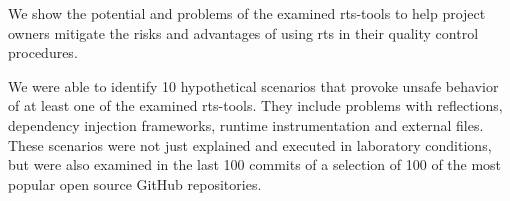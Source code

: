We show the potential and problems of the examined \ac{rts}-tools to help project owners
mitigate the risks and advantages of using \ac{rts} in their quality control procedures.

We were able to identify 10 hypothetical scenarios that provoke unsafe behavior of at least one of the
examined \ac{rts}-tools. They include problems with reflections, dependency injection frameworks,
runtime instrumentation and external files. These scenarios were not just explained and executed in laboratory
conditions, but were also examined in the last 100 commits of a selection of 100 of the most popular open source GitHub
repositories. 

